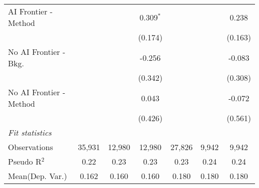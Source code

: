 \begin{tabular}{lcccccc}
   AI Frontier - Method    &                &                & 0.309$^{*}$   &                &              & 0.238\\   
                           &                &                & (0.174)       &                &              & (0.163)\\   
   No AI Frontier - Bkg.   &                &                & -0.256        &                &              & -0.083\\   
                           &                &                & (0.342)       &                &              & (0.308)\\   
   No AI Frontier - Method &                &                & 0.043         &                &              & -0.072\\   
                           &                &                & (0.426)       &                &              & (0.561)\\   
   \midrule
   \emph{Fit statistics}\\
   Observations            & 35,931         & 12,980         & 12,980        & 27,826         & 9,942        & 9,942\\  
   Pseudo R$^2$            & 0.22           & 0.23           & 0.23          & 0.23           & 0.24         & 0.24\\  
Mean(Dep. Var.) & 0.162 & 0.160 & 0.160 & 0.180 & 0.180 & 0.180 \\
   

\end{tabular}
